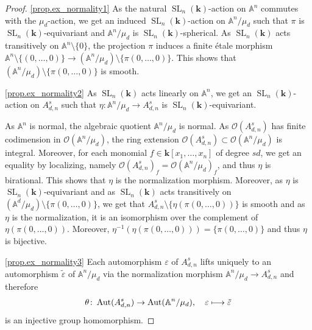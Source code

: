 \documentclass[JEP,XML,SOM,Unicode]{cedram}
\let\mathcal\mathscr
\def\mto{\mathchoice{\longmapsto}{\mapsto}{\mapsto}{\mapsto}}
\theoremstyle{plain}
\theoremstyle{definition}
\DeclareMathOperator{\SL}{SL}
\DeclareMathOperator{\Aut}{Aut}
\newcommand{\OO}{\mathcal{O}}
\renewcommand{\AA}{\mathbb{A}}
\newcommand{\kk}{{\boldsymbol{k}}}
\begin{document}
\skpt
\begin{proof}
\eqref{prop.ex_normality1}
As the natural $\SL_n(\kk)$-action on $\AA^n$ commutes with the $\mu_d$-action,
we get an induced $\SL_n(\kk)$-action on $\AA^n / \mu_d$ such that $\pi$ is $\SL_n(\kk)$-equivariant
and $\AA^n / \mu_d$ is $\SL_n(\kk)$-spherical. As $\SL_n(\kk)$ acts transitively
on $\AA^n \setminus \{0\}$, the projection $\pi$ induces a finite étale morphism
$\AA^n \setminus \{(0, \ldots, 0)\} \to (\AA^n / \mu_d) \setminus \{\pi(0, \ldots, 0 )\}$. This shows
that $(\AA^n / \mu_d) \setminus \{\pi(0, \ldots, 0 )\}$ is smooth.

\eqref{prop.ex_normality2}
As $\SL_n(\kk)$ acts linearly on $\AA^n$, we get an $\SL_n(\kk)$-action on
$A_{d, n}^s$ such that $\eta \colon \mathbb{A}^n/\mu_d \to A_{d, n}^s$ is $\SL_n(\kk)$-equivariant.

As $\AA^n$ is normal, the algebraic quotient $\AA^n / \mu_d$ is normal.
As $\OO(A_{d, n}^s)$ has finite codimension in $\OO(\AA^n / \mu_d)$, the ring
extension $\OO(A_{d, n}^s) \subset \OO(\AA^n / \mu_d)$
is integral. Moreover, for each
monomial $f \in \kk[x_1, \ldots, x_n]$ of degree $sd$, we get an
equality by localizing, namely $\OO(A_{d, n}^s)_f = \OO(\AA^n / \mu_d)_f$, and thus $\eta$ is birational.
This shows that $\eta$ is the normalization morphism.
Moreover, as $\eta$ is $\SL_n(\kk)$-equivariant
and as $\SL_n(\kk)$ acts transitively on $(\AA^d / \mu_d) \setminus \{\pi(0, \ldots, 0)\}$, we get
that $A_{d, n}^s \setminus \{\eta(\pi(0, \ldots, 0))\}$ is smooth and as $\eta$ is the normalization,
it is an isomorphism over the complement of $\eta(\pi(0, \ldots, 0))$.
Moreover, $\eta^{-1}(\eta(\pi(0, \ldots, 0))) = \{\pi(0, \ldots, 0)\}$ and thus $\eta$ is bijective.

\eqref{prop.ex_normality3}
Each automorphism $\varepsilon$ of $A_{d, n}^s$ lifts uniquely to an automorphism
$\tilde{\varepsilon}$ of $\AA^n / \mu_d$ via
the normalization morphism $\AA^n / \mu_d \to A_{d, n}^s$ and therefore
\[
\theta \colon \Aut(A_{d,n}^s) \to \Aut(\mathbb{A}^n/\mu_d), \quad\varepsilon \mto \tilde{\varepsilon}
\]
is an injective group homomorphism.


\end{proof}
\end{document}
